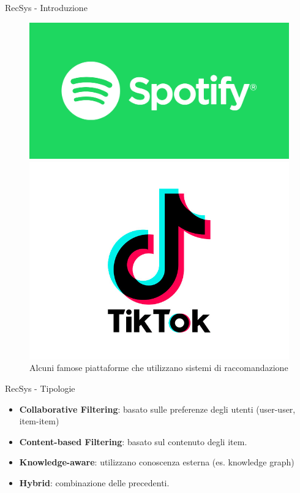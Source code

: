 \begin{frame}{RecSys - Introduzione}
\begin{figure}[h!]
\begin{minipage}{0.15\textwidth}
    \end{minipage}\hfill
    \begin{minipage}{0.15\textwidth}
        \centering
        \includegraphics[width=\textwidth]{images/spotify.png}
    \end{minipage}\hfill
    \begin{minipage}{0.15\textwidth}
        \centering
        \includegraphics[width=\textwidth]{images/tiktok.png}
    \end{minipage}
    \caption{Alcuni famose piattaforme che utilizzano sistemi di raccomandazione}
\end{figure}
\end{frame}

\begin{frame}{RecSys - Tipologie}
\begin{itemize}
    \item \textbf{Collaborative Filtering}: basato sulle preferenze degli utenti (user-user, item-item)
    \item \textbf{Content-based Filtering}: basato sul contenuto degli item.
    \item \textbf{Knowledge-aware}: utilizzano conoscenza esterna (es. knowledge graph)
    \item \textbf{Hybrid}: combinazione delle precedenti.
\end{itemize}
\end{frame}
